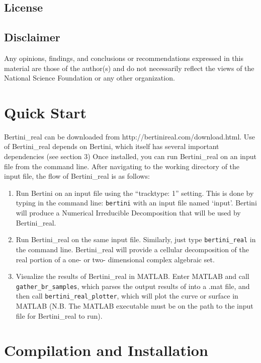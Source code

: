 \documentclass[10pt]{article}
\begin{document}
\subsection{License}
\label{sec:license}

\subsection*{Disclaimer}

Any opinions, findings, and conclusions or recommendations expressed in this material are those of the author(s) and do not necessarily reflect the views of the National Science Foundation or any other organization.




\clearpage
\section{Quick Start}

Bertini\_real can be downloaded from http://bertinireal.com/download.html. Use of Bertini\_real depends on Bertini, which itself has several important dependencies (see section 3)
Once installed, you can run Bertini\_real on an input file from the command line. After navigating to the working directory of the input file, the flow of Bertini\_real is as follows:
\begin{enumerate}
\item Run Bertini on an input file using the ``tracktype: 1'' setting. This is done by typing in the command line: \texttt{bertini} with an input file named `input'. Bertini will produce a Numerical Irreducible Decomposition that will be used by Bertini\_real.
\item Run Bertini\_real on the same input file. Similarly, just type \texttt{bertini\_real} in the command line. Bertini\_real will provide a cellular decomposition of the real portion of a one- or two- dimensional complex algebraic set.
\item Visualize the results of Bertini\_real in MATLAB. Enter MATLAB and call \texttt{gather\_br\_samples}, which parses the output results of  into a .mat file, and then call \texttt{bertini\_real\_plotter}, which will plot the curve or surface in MATLAB (N.B. The MATLAB executable must be on the path to the input file for Bertini\_real to run).
\end{enumerate}
\label{sec:started}

\section{Compilation and Installation}
\end{document}
